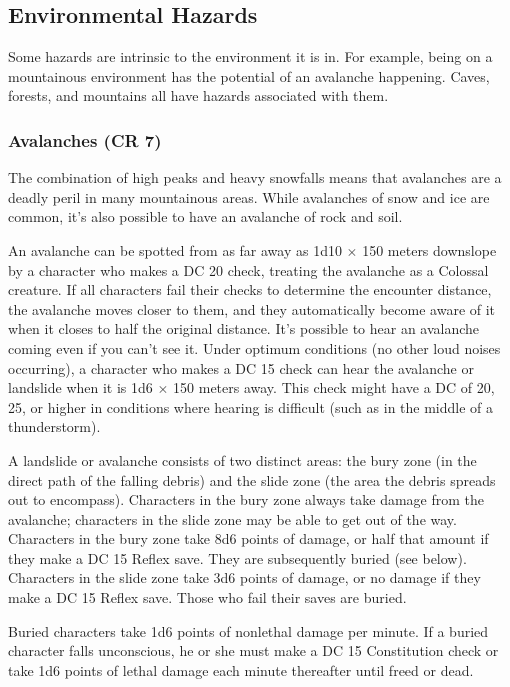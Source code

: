 \subsection{Environmental Hazards}
Some hazards are intrinsic to the environment it is in. For example, being on a mountainous environment has the potential of an avalanche happening. Caves, forests, and mountains all have hazards associated with them.

\subsubsection{Avalanches (CR 7)}
The combination of high peaks and heavy snowfalls means that avalanches are a deadly peril in many mountainous areas. While avalanches of snow and ice are common, it's also possible to have an avalanche of rock and soil.

An avalanche can be spotted from as far away as 1d10 $\times$ 150 meters downslope by a character who makes a DC 20  check, treating the avalanche as a Colossal creature. If all characters fail their  checks to determine the encounter distance, the avalanche moves closer to them, and they automatically become aware of it when it closes to half the original distance. It's possible to hear an avalanche coming even if you can't see it. Under optimum conditions (no other loud noises occurring), a character who makes a DC 15  check can hear the avalanche or landslide when it is 1d6 $\times$ 150 meters away. This check might have a DC of 20, 25, or higher in conditions where hearing is difficult (such as in the middle of a thunderstorm).

A landslide or avalanche consists of two distinct areas: the bury zone (in the direct path of the falling debris) and the slide zone (the area the debris spreads out to encompass). Characters in the bury zone always take damage from the avalanche; characters in the slide zone may be able to get out of the way. Characters in the bury zone take 8d6 points of damage, or half that amount if they make a DC 15 Reflex save. They are subsequently buried (see below). Characters in the slide zone take 3d6 points of damage, or no damage if they make a DC 15 Reflex save. Those who fail their saves are buried.

Buried characters take 1d6 points of nonlethal damage per minute. If a buried character falls unconscious, he or she must make a DC 15 Constitution check or take 1d6 points of lethal damage each minute thereafter until freed or dead.

